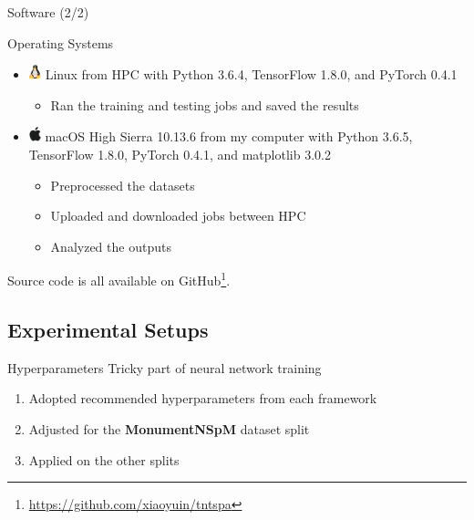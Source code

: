 \documentclass[11pt]{beamer}
\begin{document}
\begin{frame}{Software (2/2)}
    \begin{block}{Operating Systems}
        \begin{itemize}
            \item \includegraphics[height=12pt]{linux} Linux from HPC with Python 3.6.4, TensorFlow 1.8.0, and PyTorch 0.4.1
            \begin{itemize}
                \item Ran the training and testing jobs and saved the results
            \end{itemize}
            \item \includegraphics[height=12pt]{apple} macOS High Sierra 10.13.6 from my computer with Python 3.6.5, TensorFlow 1.8.0, PyTorch 0.4.1, and matplotlib 3.0.2
            \begin{itemize}
                \item Preprocessed the datasets
                \item Uploaded and downloaded jobs between HPC
                \item Analyzed the outputs
            \end{itemize}
        \end{itemize}
    \end{block}
    Source code is all available on GitHub\footnote{\url{https://github.com/xiaoyuin/tntspa}}.
\end{frame}

\subsection{Experimental Setups}

\begin{frame}{Hyperparameters}
    Tricky part of neural network training
    \medskip
    \begin{enumerate}
        \item Adopted recommended hyperparameters from each framework
        \item Adjusted for the \textbf{MonumentNSpM} dataset split
        \item Applied on the other splits
    \end{enumerate}
\end{frame}
\end{document}
